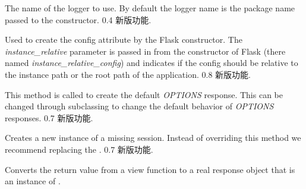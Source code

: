 \documentclass[a4paper,12pt]{sphinxmanual}
\begin{document}
\begin{fulllineitems}
\begin{fulllineitems}
\label{api:flask.Flask.logger_name}
The name of the logger to use.  By default the logger name is the
package name passed to the constructor.
0.4 新版功能.
\end{fulllineitems}


\begin{fulllineitems}
\label{api:flask.Flask.make_config}
Used to create the config attribute by the Flask constructor.
The \emph{instance\_relative} parameter is passed in from the constructor
of Flask (there named \emph{instance\_relative\_config}) and indicates if
the config should be relative to the instance path or the root path
of the application.
0.8 新版功能.
\end{fulllineitems}


\begin{fulllineitems}
\label{api:flask.Flask.make_default_options_response}
This method is called to create the default \emph{OPTIONS} response.
This can be changed through subclassing to change the default
behavior of \emph{OPTIONS} responses.
0.7 新版功能.
\end{fulllineitems}


\begin{fulllineitems}
\label{api:flask.Flask.make_null_session}
Creates a new instance of a missing session.  Instead of overriding
this method we recommend replacing the {\hyperref[api:flask.Flask.session_interface]{}}.
0.7 新版功能.
\end{fulllineitems}


\begin{fulllineitems}
\label{api:flask.Flask.make_response}
Converts the return value from a view function to a real
response object that is an instance of {\hyperref[api:flask.Flask.response_class]{}}.


\end{fulllineitems}
\end{fulllineitems}
\end{document}
